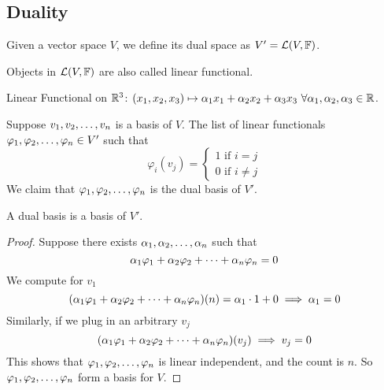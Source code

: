 \subsection{Duality}
\begin{definition}
    Given a vector space $V$, we define its dual space as $V' = \mathcal L(V,\mathbb F)$. 
\end{definition}
\begin{remark}
    Objects in $\mathcal L(V,\mathbb F)$ are also called linear functional.
\end{remark}
\begin{example}
    Linear Functional on $\mathbb R^3$: $(x_1, x_2, x_3) \mapsto \alpha_1 x_1 + \alpha_2 x_2 + \alpha_3 x_3 \ \forall \alpha_1, \alpha_2, \alpha_3 \in \mathbb R$.
\end{example}
\begin{definition}
    Suppose ${v}_1,{v}_2, \ldots, {v}_{n}$ is a basis of $V$. The list of linear functionals ${\varphi}_1,{\varphi}_2, \ldots, {\varphi}_{n} \in  V'$ such that \[\varphi_i(v_j) = \left\{ \begin{array}{cc}
         1 \text{ if } i = j \\
         0 \text{ if } i \neq j
    \end{array} \right.\] We claim that ${\varphi}_1,{\varphi}_2, \ldots, {\varphi}_{n}$ is the dual basis of $V'$.
\end{definition}
\begin{lemma}
    A dual basis is a basis of $V'$.
\end{lemma}
\begin{proof}
    Suppose there exists ${\alpha}_1,{\alpha}_2, \ldots, {\alpha}_{n}$ such that 
    \[ {\alpha}_1{\varphi}_1 + {\alpha}_2{\varphi}_2 + \cdots + {\alpha}_{n}{\varphi}_{n} = 0\]
    We compute for $v_1$
    \[ ({\alpha}_1{\varphi}_1 + {\alpha}_2{\varphi}_2 + \cdots + {\alpha}_{n}{\varphi}_{n})(n) = \alpha_1 \cdot 1 + 0 \implies \alpha_1 = 0\]
    Similarly, if we plug in an arbitrary $v_j$
    \[ ({\alpha}_1{\varphi}_1 + {\alpha}_2{\varphi}_2 + \cdots + {\alpha}_{n}{\varphi}_{n})(v_j) \implies v_j = 0\]
    This shows that ${\varphi}_1,{\varphi}_2, \ldots, {\varphi}_{n}$ is linear independent, and the count is $n$. So ${\varphi}_1,{\varphi}_2, \ldots, {\varphi}_{n}$ form a basis for $V$.
\end{proof}
